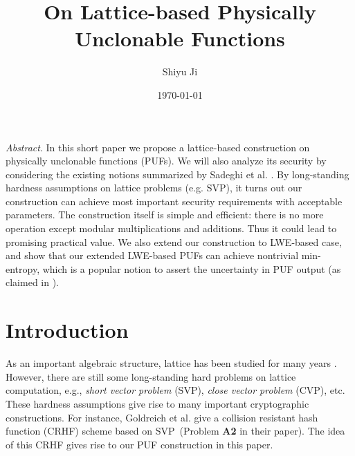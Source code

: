 \documentclass[12pt]{article}
\newcommand{\SVP}{\textsf{SVP}}
\newcommand{\CVP}{\textsf{CVP}}
\theoremstyle{definition}
\begin{document}
\title{On Lattice-based Physically Unclonable Functions}
\author{Shiyu Ji}
\date{\today}
\maketitle

{\it Abstract}. 
In this short paper we propose a lattice-based construction on physically unclonable functions (PUFs). We will also analyze its security by considering the existing notions summarized by Sadeghi et al. \cite{sadeghi2016towards}. By long-standing hardness assumptions on lattice problems (e.g. \SVP), it turns out our construction can achieve most important security requirements with acceptable parameters. The construction itself is simple and efficient: there is no more operation except modular multiplications and additions. Thus it could lead to promising practical value. We also extend our construction to LWE-based case, and show that our extended LWE-based PUFs can achieve nontrivial min-entropy, which is a popular notion to assert the uncertainty in PUF output (as claimed in \cite{sadeghi2016towards}). 

\section{Introduction}


As an important algebraic structure, lattice has been studied for many years \cite{regev2009lattices}. However, there are still some long-standing hard problems on lattice computation, e.g., \emph{short vector problem} (\SVP), \emph{close vector problem} (\CVP), etc. These hardness assumptions give rise to many important cryptographic constructions. For instance, Goldreich et al. \cite{goldreich2011collision} give a collision resistant hash function (CRHF) scheme based on \SVP\, (Problem {\bf A2} in their paper). The idea of this CRHF gives rise to our PUF construction in this paper.



	
\end{document}
